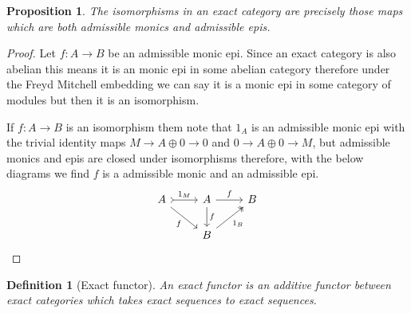 \documentclass[12pt]{report}
\numberwithin{equation}{section}
\newtheorem{definition}[dummy]{Definition}
\newtheorem{proposition}[dummy]{Proposition}
\begin{document}
		
		\begin{proposition}\label{prop:isoinexact}
			The isomorphisms in an exact category are precisely those maps which are both admissible monics and admissible epis.
		\end{proposition}
		\begin{proof}
			Let $f: A \to B$ be an admissible monic epi. Since an exact category is also abelian this means it is an monic epi in some abelian category therefore under the Freyd Mitchell embedding we can say it is a monic epi in some category of modules but then it is an isomorphism.
			
			If $f: A \to B$ is an isomorphism them note that $1_A$ is an admissible monic epi with the trivial identity maps $M \to A \oplus 0 \to 0$ and $0 \to A \oplus 0 \to M$, but admissible monics and epis are closed under isomorphisms therefore, with the below diagrams we find $f $ is a admissible monic and an admissible epi.
				\[\begin{tikzcd}
				A & A & B \\
				& B
				\arrow["{1_M}", tail, from=1-1, to=1-2]
				\arrow["f"', from=1-1, to=2-2]
				\arrow["f", from=1-2, to=1-3]
				\arrow["f", from=1-2, to=2-2]
				\arrow["{1_B}"', two heads, from=2-2, to=1-3]
			\end{tikzcd}\]
		\end{proof}
		\begin{definition}[Exact functor]
			An exact functor is an additive functor between exact categories which takes exact sequences to exact sequences.
		\end{definition}
		
		
\end{document}
